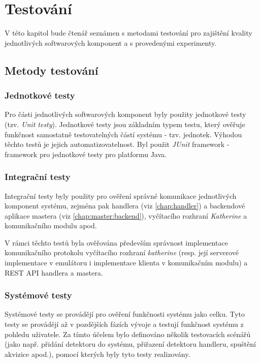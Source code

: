 

\chapter{Testování}\label{chap:test}
V této kapitol bude čtenář seznámen s metodami testování pro zajištění kvality jednotlivých softwarových komponent a s provedenými experimenty.

\section{Metody testování}
\subsection{Jednotkové testy}
Pro části jednotlivých softwarových komponent byly použity jednotkové testy \cite{testing_evans} (tzv. \textit{Unit testy}). Jednotkové testy jsou základním typem testu, který ověřuje funkčnost samostatně testovatelných částí systému - tzv. jednotek. Výhodou těchto testů je jejich automatizovatelnost. Byl použit \textit{JUnit} framework - framework pro jednotkové testy pro platformu Java. 

\subsection{Integrační testy}
Integrační testy byly použity pro ověření správné komunikace jednotlivých komponent systému, zejména pak handlera (viz \ref{chap:handler}) a backendové aplikace mastera (viz \ref{chap:master:backend}), vyčítacího rozhraní \textit{Katherine} a komunikačního modulu apod.

V rámci těchto testů byla ověřována především správnost implementace komunikačního protokolu vyčítacího rozhraní \textit{katherine} (resp. její serverové implementace v emulátoru i implementace klienta v komunikačním modulu) a REST API handlera a mastera.

\subsection{Systémové testy}
Systémové testy se provádějí pro ověření funkčnosti systému jako celku. Tyto testy se provádějí až v pozdějších fázích vývoje a testují funkčnost systému z pohledu uživatele. Za tímto účelem bylo definováno několik testovacích scénářů (jako např. přidání detektoru do systému, přiřazení detektoru handleru, spuštění akvizice apod.), pomocí kterých byly tyto testy realizovány.

